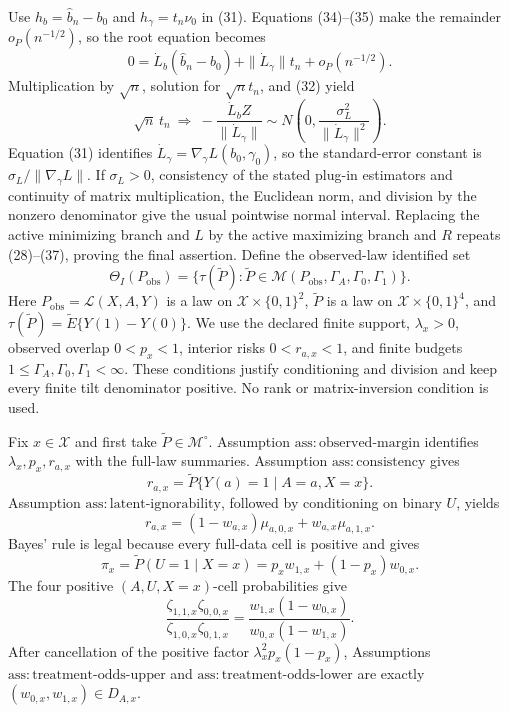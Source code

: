 Use \(h_b=\widehat b_n-b_0\) and \(h_\gamma=t_n\nu_0\) in (31).  Equations (34)--(35) make the remainder \(o_P(n^{-1/2})\), so the root equation becomes
\[
 0=\dot L_b(\widehat b_n-b_0)+\|\dot L_\gamma\|t_n+o_P(n^{-1/2}).     \tag{36}
\]
Multiplication by \(\sqrt n\), solution for \(\sqrt n t_n\), and (32) yield
\[
 \sqrt n\,t_n
 \ \Longrightarrow\
 -\frac{\dot L_bZ}{\|\dot L_\gamma\|}
 \sim N\!\left(0,\frac{\sigma_L^2}{\|\dot L_\gamma\|^2}\right).    \tag{37}
\]
Equation (31) identifies \(\dot L_\gamma=\nabla_\gamma L(b_0,\gamma_0)\), so the standard-error constant is \(\sigma_L/\|\nabla_\gamma L\|\).  If \(\sigma_L>0\), consistency of the stated plug-in estimators and continuity of matrix multiplication, the Euclidean norm, and division by the nonzero denominator give the usual pointwise normal interval.  Replacing the active minimizing branch and \(L\) by the active maximizing branch and \(R\) repeats (28)--(37), proving the final assertion.
Define the observed-law identified set
\[
 \Theta_I(P_{\mathrm{obs}})
 =\{\tau(\widetilde P):
       \widetilde P\in\mathcal M(P_{\mathrm{obs}},\Gamma_A,\Gamma_0,\Gamma_1)\}.
                                                                            \tag{38}
\]
Here \(P_{\mathrm{obs}}=\mathcal L(X,A,Y)\) is a law on \(\mathcal X\times\{0,1\}^2\), \(\widetilde P\) is a law on \(\mathcal X\times\{0,1\}^4\), and \(\tau(\widetilde P)=\widetilde E\{Y(1)-Y(0)\}\).  We use the declared finite support, \(\lambda_x>0\), observed overlap \(0<p_x<1\), interior risks \(0<r_{a,x}<1\), and finite budgets \(1\leq\Gamma_A,\Gamma_0,\Gamma_1<\infty\).  These conditions justify conditioning and division and keep every finite tilt denominator positive.  No rank or matrix-inversion condition is used.

Fix \(x\in\mathcal X\) and first take \(\widetilde P\in\mathcal M^{\circ}\).  Assumption \(\mathrm{ass{:}observed\text{-}margin}\) identifies \(\lambda_x,p_x,r_{a,x}\) with the full-law summaries.  Assumption \(\mathrm{ass{:}consistency}\) gives
\[
 r_{a,x}=\widetilde P\{Y(a)=1\mid A=a,X=x\}.
\]
Assumption \(\mathrm{ass{:}latent\text{-}ignorability}\), followed by conditioning on binary \(U\), yields
\[
 r_{a,x}=(1-w_{a,x})\mu_{a,0,x}+w_{a,x}\mu_{a,1,x}.                    \tag{39}
\]
Bayes' rule is legal because every full-data cell is positive and gives
\[
 \pi_x=\widetilde P(U=1\mid X=x)
      =p_xw_{1,x}+(1-p_x)w_{0,x}.                                      \tag{40}
\]
The four positive \((A,U,X=x)\)-cell probabilities give
\[
 \frac{\zeta_{1,1,x}\zeta_{0,0,x}}
      {\zeta_{1,0,x}\zeta_{0,1,x}}
 =\frac{w_{1,x}(1-w_{0,x})}{w_{0,x}(1-w_{1,x})}.                       \tag{41}
\]
After cancellation of the positive factor \(\lambda_x^2p_x(1-p_x)\), Assumptions \(\mathrm{ass{:}treatment\text{-}odds\text{-}upper}\) and \(\mathrm{ass{:}treatment\text{-}odds\text{-}lower}\) are exactly \((w_{0,x},w_{1,x})\in D_{A,x}\).

